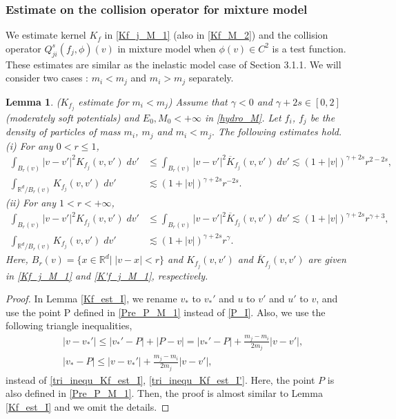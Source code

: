 \documentclass[reqno,10pt]{amsart}
\newtheorem{lemma}[theorem]{Lemma}
\numberwithin{equation}{section}
\begin{document}
\subsubsection{Estimate on the collision operator for mixture model}
We estimate kernel $K_f$ in \eqref{Kf_j_M_1} (also in \eqref{Kf_M_2}) and the collision operator $Q^{s}_{ji}(f_j,\phi)(v)$ in mixture model when  $\phi(v)\in C^{2}$ is a test function. These estimates are similar as the inelastic model case of  Section 3.1.1.  We will consider two cases : $m_i<m_j$ and $m_i>m_j$ separately. \vspace{2mm}

\begin{lemma} ($K_{f_j}$ estimate for $m_i < m_j$) \label{Kf_j_estimate_M_1}
Assume that $\gamma<0$ and $\gamma+2s \in [0,2]$(moderately soft potentials) and $E_0,M_0<+\infty$ in \eqref{hydro_M}. Let $f_i$, $f_j$ be the density of particles of mass $m_i$, $m_j$ and $m_i<m_j.$ The following estimates hold. \\
(i) For any $0<r \leq 1$,
\begin{align*} 
    \int_{B_{r}(v)}|v-v'|^2K_{f_j}(v,v')\; dv' &\leq \int_{B_{r}(v)}|v-v'|^2\overline{K}_{f_j}(v,v')\; dv' \lesssim (1+|v|)^{\gamma+2s}r^{2-2s}, \\
     \int_{\mathbb{R}^d/B_{r}(v)}K_{f_j}(v,v')\; dv' &\lesssim (1+|v|)^{\gamma+2s}r^{-2s}.
\end{align*}
(ii) For any $1<r<+\infty$,
\begin{align*}  
    \int_{B_{r}(v)}|v-v'|^2K_{f_j}(v,v')\; dv' &\leq \int_{B_{r}(v)}|v-v'|^2\overline{K}_{f_j}(v,v')\; dv' \lesssim (1+|v|)^{\gamma+2s}r^{\gamma+3}, \\
     \int_{\mathbb{R}^d/B_{r}(v)}K_{f_j}(v,v')\; dv' &\lesssim (1+|v|)^{\gamma+2s}r^{\gamma}.
\end{align*}
Here, $B_r(v) =\{x\in \mathbb{R}^d | \;|v-x|<r \}$ and
$K_{f_j}(v,v')$ and $\overline{K}_{f_j}(v,v')$ are given in \eqref{Kf_j_M_1} and \eqref{K'f_j_M_1}, respectively.
\end{lemma}
\begin{proof} In Lemma \ref{Kf_est_I}, we rename $v_*$ to $v_*'$ and $u$ to $v'$ and $u'$ to $v$, and use the point P defined in \eqref{Pre_P_M_1} instead of \eqref{P_I}. 
Also, we use the following triangle inequalities, 
\begin{align} 
    &|v-v_*'| \leq |v_*'-P|+|P-v| = |v_*'-P|+\frac{m_j-m_i}{2m_j}|v-v'|, \label{Kf_inequal_M_1} \\
    &|v_*-P| \leq |v-v_*'|+\frac{m_j-m_i}{2m_j}|v-v'|, \label{Kf_inequal_M_1'}
\end{align} instead of \eqref{tri_inequ_Kf_est_I}, \eqref{tri_inequ_Kf_est_I'}.
Here, the point $P$ is also defined in \eqref{Pre_P_M_1}. Then, the proof is almost similar to Lemma \ref{Kf_est_I} and we omit the details.
\end{proof} \vspace{3mm}
\end{document}

